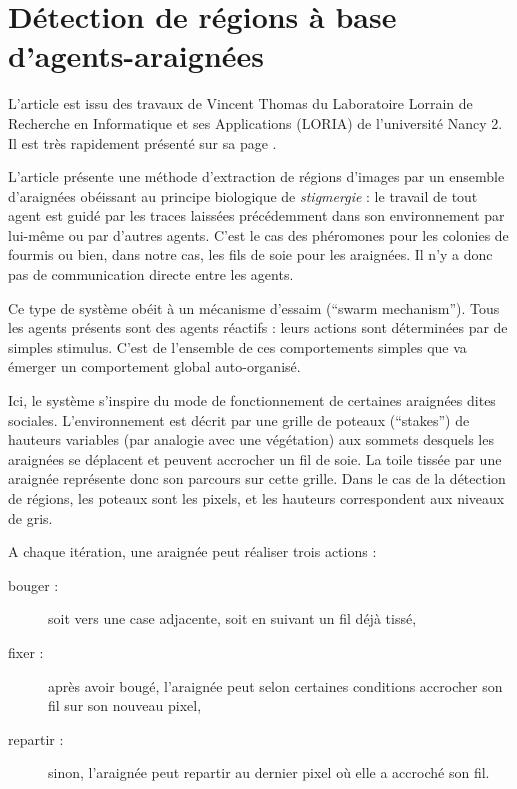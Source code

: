 \section{Détection de régions à base d'agents-araignées}


L'article \cite{spiders2} est issu des travaux de Vincent Thomas du Laboratoire Lorrain de Recherche en Informatique et ses Applications (LORIA) de l'université Nancy 2.
Il est très rapidement présenté sur sa page \cite{spiders1}.

L'article présente une méthode d'extraction de régions d'images par un ensemble d'araignées obéissant au principe biologique de \emph{stigmergie} : le travail de tout agent est guidé par les traces laissées précédemment dans son environnement par lui-même ou par d'autres agents. C'est le cas des phéromones pour les colonies de fourmis ou bien, dans notre cas, les fils de soie pour les araignées. Il n'y a donc pas de communication directe entre les agents.

Ce type de système obéit à un \og{} mécanisme d'essaim \fg{} (``swarm mechanism''). Tous les agents présents sont des agents réactifs : leurs actions sont déterminées par de simples stimulus. C'est de l'ensemble de ces comportements simples que va émerger un comportement global auto-organisé.
 
Ici, le système s'inspire du mode de fonctionnement de certaines araignées dites sociales. L'environnement est décrit par une grille de poteaux (``stakes'') de hauteurs variables (par analogie avec une végétation) aux sommets desquels les araignées se déplacent et peuvent accrocher un fil de soie. La toile tissée par une araignée représente donc son parcours sur cette grille.
Dans le cas de la détection de régions, les poteaux sont les pixels, et les hauteurs correspondent aux niveaux de gris.

A chaque itération, une araignée peut réaliser trois actions :
\begin{description}
  \item[bouger :] soit vers une case adjacente, soit en suivant un fil déjà tissé,
  \item[fixer :] après avoir bougé, l'araignée peut selon certaines conditions accrocher son fil sur son nouveau pixel,
  \item[repartir :] sinon, l'araignée peut repartir au dernier pixel où elle a accroché son fil.
\end{description}

